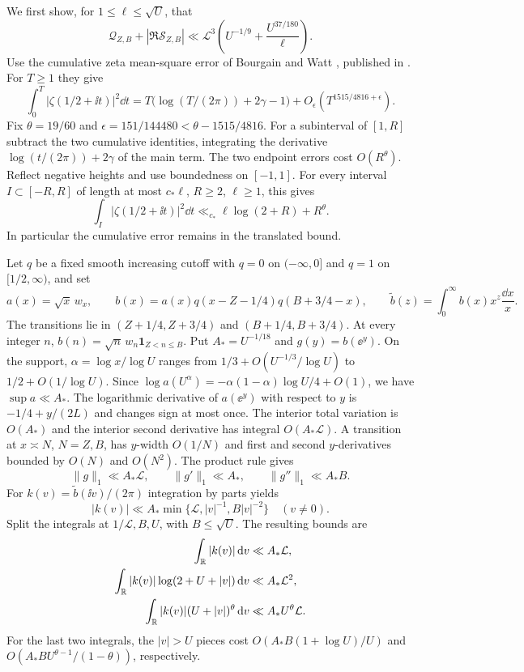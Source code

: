We first show, for \(1\le\ell\le\sqrt U\), that
\begin{equation}\label{eq:b10-high}
 \mathcal Q_{Z,B}+|\Re\mathcal S_{Z,B}|
 \ll\mathcal L^3\left(U^{-1/9}+\frac{U^{37/180}}{\ell}\right).
\end{equation}
Use the cumulative zeta mean-square error of Bourgain and Watt
\cite[Theorem 4]{BourgainWattPerturbedCones2015v1}, published in
\cite{BourgainWattPerturbedCones2018}. For \(T\ge1\) they give
\[
 \int_0^T|\zeta(1/2+\ii t)|^2\dd t
 =T\bigl(\log(T/(2\pi))+2\gamma-1\bigr)
      +O_\epsilon(T^{1515/4816+\epsilon}).
\]
Fix \(\theta=19/60\) and
\(\epsilon=151/144480<\theta-1515/4816\).
For a subinterval of \([1,R]\) subtract the two cumulative
identities, integrating the derivative
\(\log(t/(2\pi))+2\gamma\) of the main term.
The two endpoint errors cost \(O(R^\theta)\). Reflect negative heights
and use boundedness on \([-1,1]\). For every interval \(I\subset[-R,R]\)
of length at most \(c_*\ell\), \(R\ge2\), \(\ell\ge1\), this gives
\begin{equation}\label{eq:b10-local-zeta}
 \int_I|\zeta(1/2+\ii t)|^2\dd t
 \ll_{c_*} \ell\log(2+R)+R^\theta.
\end{equation}
In particular the cumulative error remains in the translated bound.

Let \(q\) be a fixed smooth increasing cutoff with \(q=0\) on
\((-\infty,0]\) and \(q=1\) on \([1/2,\infty)\), and set
\[
 a(x)=\sqrt x\,w_x,\qquad
 b(x)=a(x)q(x-Z-1/4)q(B+3/4-x),\qquad
 \widetilde b(z)=\int_0^\infty b(x)x^z\frac{\dd x}{x}.
\]
The transitions lie in \((Z+1/4,Z+3/4)\) and
\((B+1/4,B+3/4)\). At every integer \(n\),
\(b(n)=\sqrt n\,w_n\mathbf1_{Z<n\le B}\).
Put \(A_*=U^{-1/18}\) and \(g(y)=b(\ee^y)\). On the support,
\(\alpha=\log x/\log U\) ranges from \(1/3+O(U^{-1/3}/\log U)\)
to \(1/2+O(1/\log U)\).
Since \(\log a(U^\alpha)=-\alpha(1-\alpha)\log U/4+O(1)\),
we have \(\sup a\ll A_*\). The logarithmic derivative of \(a(\ee^y)\)
with respect to \(y\) is \(-1/4+y/(2L)\) and changes sign at most once.
The interior total variation is \(O(A_*)\) and the interior
second derivative has integral \(O(A_*\mathcal L)\).
A transition at \(x\asymp N\), \(N=Z,B\), has \(y\)-width
\(O(1/N)\) and first and second \(y\)-derivatives bounded by
\(O(N)\) and \(O(N^2)\). The product rule gives
\[
 \|g\|_1\ll A_*\mathcal L,\qquad
 \|g'\|_1\ll A_*,\qquad
 \|g''\|_1\ll A_*B.
\]
For \(k(v)=\widetilde b(\ii v)/(2\pi)\) integration by parts yields
\[
 |k(v)|\ll A_*\min\{\mathcal L,|v|^{-1},B|v|^{-2}\}
 \quad(v\ne0).
\]
Split the integrals at \(1/\mathcal L,B,U\), with \(B\le\sqrt U\).
The resulting bounds are
\begin{align*}
 \int_\mathbb R |k(v)|\,\mathrm d v&\ll A_*\mathcal L,\\
 \int_\mathbb R |k(v)|\log(2+U+|v|)\,\mathrm d v&\ll A_*\mathcal L^2,\\
 \int_\mathbb R |k(v)|(U+|v|)^\theta\,\mathrm d v&\ll A_*U^\theta\mathcal L.
\end{align*}
For the last two integrals, the \(|v|>U\) pieces cost
\(O(A_*B(1+\log U)/U)\) and \(O(A_*B U^{\theta-1}/(1-\theta))\),
respectively.

